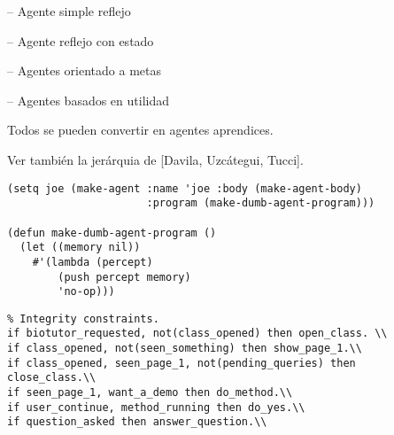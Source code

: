 \documentclass{article}
\begin{document}
\begin{huge}
-- Agente simple reflejo\al

-- Agente reflejo con estado\al

-- Agentes orientado a metas\al

-- Agentes basados en utilidad

Todos se pueden convertir en agentes aprendices.

Ver tambi{\'e}n la jer{\'a}rquia de [Davila, Uzc{\'a}tegui,
Tucci].


\textwidth
{}



\textwidth
{}



\textwidth
{}



\textwidth
{}


\textwidth
{}



\begin{verbatim}
(setq joe (make-agent :name 'joe :body (make-agent-body)
                      :program (make-dumb-agent-program)))

(defun make-dumb-agent-program ()
  (let ((memory nil))
    #'(lambda (percept)
        (push percept memory)
        'no-op)))
\end{verbatim}



\begin{verbatim}
% Integrity constraints.
if biotutor_requested, not(class_opened) then open_class. \\
if class_opened, not(seen_something) then show_page_1.\\
if class_opened, seen_page_1, not(pending_queries) then
close_class.\\
if seen_page_1, want_a_demo then do_method.\\
if user_continue, method_running then do_yes.\\
if question_asked then answer_question.\\


\end{verbatim}
\end{huge}
\end{document}
